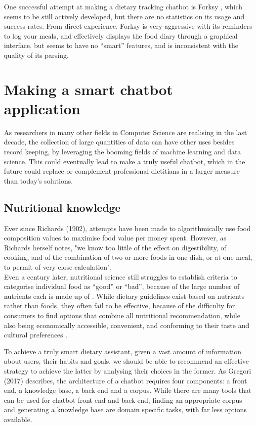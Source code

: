 One successful attempt at making a dietary tracking chatbot is Forksy \cite{forksywebsite}, which seems to be still actively developed, but there are no statistics on its usage and success rates. From direct experience, Forksy is very aggressive with its reminders to log your meals, and effectively displays the food diary through a graphical interface, but seems to have no ``smart'' features, and is inconsistent with the quality of its parsing.
\section{Making a smart chatbot application}
As researchers in many other fields in Computer Science are realising in the last decade, the collection of large quantities of data can have other uses besides record keeping, by leveraging the booming fields of machine learning and data science. This could eventually lead to make a truly useful chatbot, which in the future could replace or complement professional dietitians in a larger measure than today's solutions. 
\subsection{Nutritional knowledge}
Ever since Richards (1902)\cite{Richards1902a}, attempts have been made to algorithmically use food composition values to maximise food value per money spent. However, as Richards herself notes, "we know too little of the effect on digestibility, of cooking, and of the combination of two or more foods in one dish, or at one meal, to permit of very close calculation". \\
Even a century later, nutritional science still struggles to establish criteria to categorise individual food as ``good'' or ``bad'', because of the large number of nutrients each is made up of \cite{USDAFoodandNutritionService2007}. While dietary guidelines exist based on nutrients rather than foods, they often fail to be effective, because of the difficulty for consumers to find options that combine all nutritional recommendation, while also being economically accessible, convenient, and conforming to their taste and cultural preferences \cite{Green2015}. 

To achieve a truly smart dietary assistant, given a vast amount of information about users, their habits and goals, we should be able to recommend an effective strategy to achieve the latter by analysing their choices in the former. As Gregori (2017)\cite{Gregori} describes, the architecture of a chatbot requires four components: a front end, a knowledge base, a back end and a corpus. While there are many tools that can be used for chatbot front end and back end, finding an appropriate corpus and generating a knowledge base are domain specific tasks, with far less options available. 

